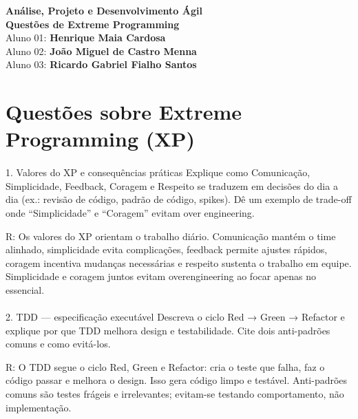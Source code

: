 \documentclass[12pt,a4paper]{article}
\begin{document}
\begin{center}
    \centering

    {\huge \textbf{Análise, Projeto e Desenvolvimento Ágil}}\\[0.5cm]

    {\Huge \textbf{Questões de Extreme Programming}}\\[0.5cm]

    {\large Aluno 01: \textbf{Henrique Maia Cardosa}}\\[0.5cm]
    {\large Aluno 02: \textbf{João Miguel de Castro Menna}}\\[0.5cm]
    {\large Aluno 03: \textbf{Ricardo Gabriel Fialho Santos}}\\[2.5cm]
\end{center}


\pagebreak

\section*{Questões sobre Extreme Programming (XP)}

\paragraph{}

1. Valores do XP e consequências práticas Explique como Comunicação,
Simplicidade, Feedback, Coragem e Respeito se traduzem em decisões do dia a dia
(ex.: revisão de código, padrão de código, spikes). Dê um exemplo de trade-off onde
“Simplicidade” e “Coragem” evitam over engineering.

R: Os valores do XP orientam o trabalho diário. Comunicação mantém o time alinhado,
simplicidade evita complicações, feedback permite ajustes rápidos, coragem incentiva
mudanças necessárias e respeito sustenta o trabalho em equipe. Simplicidade e coragem
juntos evitam overengineering ao focar apenas no essencial.

\paragraph{}

2. TDD — especificação executável Descreva o ciclo Red → Green → Refactor e
explique por que TDD melhora design e testabilidade. Cite dois anti-padrões comuns
e como evitá-los.

R: O TDD segue o ciclo Red, Green e Refactor: cria o teste que falha, faz o código passar e
melhora o design. Isso gera código limpo e testável. Anti-padrões comuns são testes frágeis
e irrelevantes; evitam-se testando comportamento, não implementação.
\end{document}
